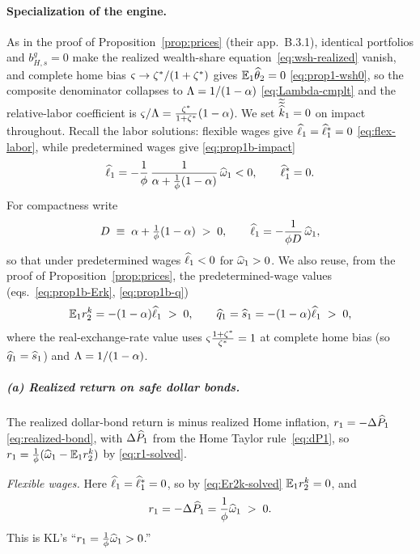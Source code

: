 \paragraph{Specialization of the engine.} As in the proof of
Proposition~\ref{prop:prices} (their app.~B.3.1), identical portfolios and
$b^g_{H,s}=0$ make the realized wealth-share equation~\eqref{eq:wsh-realized}
vanish, and complete home bias $\varsigma\to\zeta^{*}/(1+\zeta^{*})$ gives
$\mathbb{E}_1\widehat{\theta}_2=0$ \eqref{eq:prop1-wsh0}, so the composite denominator
collapses to $\Lambda=1/(1-\alpha)$ \eqref{eq:Lambda-cmplt} and the
relative-labor coefficient is $\varsigma/\Lambda=\frac{\zeta^{*}}{1+\zeta^{*}}(1-\alpha)$. We
set $\widetilde{\widetilde{\widehat{k}}}_1=0$ on impact throughout. Recall the labor
solutions: flexible wages give $\widehat{\ell}_1=\widehat{\ell}^{*}_1=0$
\eqref{eq:flex-labor}, while predetermined wages give \eqref{eq:prop1b-impact}
\[
\widehat{\ell}_1 = -\frac{1}{\phi}\,\frac{1}{\alpha+\frac{1}{\phi}(1-\alpha)}\,\widehat{\omega}_1 < 0,
\qquad \widehat{\ell}^{*}_1 = 0.
\]
For compactness write
\begin{equation}
D \;\equiv\; \alpha+\tfrac{1}{\phi}(1-\alpha) \;>\;0,
\qquad
\widehat{\ell}_1 = -\frac{1}{\phi D}\,\widehat{\omega}_1, \label{eq:prop2-Ddef}
\end{equation}
so that under predetermined wages $\widehat{\ell}_1<0$ for $\widehat{\omega}_1>0$. We also
reuse, from the proof of Proposition~\ref{prop:prices}, the predetermined-wage
values (eqs.~\eqref{eq:prop1b-Erk}, \eqref{eq:prop1b-q})
\begin{equation}
\mathbb{E}_1r^{k}_2 = -(1-\alpha)\widehat{\ell}_1 \;>\;0,
\qquad
\widehat{q}_1 = \widehat{s}_1 = -(1-\alpha)\widehat{\ell}_1 \;>\;0, \label{eq:prop2-reuse}
\end{equation}
where the real-exchange-rate value uses $\varsigma\frac{1+\zeta^{*}}{\zeta^{*}}=1$ at complete
home bias (so $\widehat{q}_1=\widehat{s}_1$) and $\Lambda=1/(1-\alpha)$.

\subparagraph{(a) Realized return on safe dollar bonds.} The realized dollar-bond
return is minus realized Home inflation, $r_1=-\Delta\widehat{P}_1$
\eqref{eq:realized-bond}, with $\Delta\widehat{P}_1$ from the Home Taylor
rule~\eqref{eq:dP1}, so $r_1=\frac{1}{\phi}(\widehat{\omega}_1-\mathbb{E}_1r^{k}_2)$ by
\eqref{eq:r1-solved}.

\emph{Flexible wages.} Here $\widehat{\ell}_1=\widehat{\ell}^{*}_1=0$, so by
\eqref{eq:Er2k-solved} $\mathbb{E}_1r^{k}_2=0$, and
\begin{equation}
r_1 = -\Delta\widehat{P}_1 = \frac{1}{\phi}\widehat{\omega}_1 \;>\;0. \label{eq:prop2a-flex}
\end{equation}
This is KL's ``$r_1=\frac{1}{\phi}\widehat{\omega}_1>0$.''


